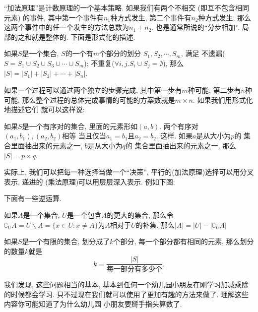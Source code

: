  ``加法原理''是计数原理的一个基本策略. 
如果我们有两个不相交 (即互不包含相同元素) 的事件, 其中第一个事件有$n_1$种方式发生, 
第二个事件有$n_2$种方式发生, 那么这两个事件中的任一个发生的方法总数为$n_1 + n_2$. 
也是通常所说的``分步相加''. 局部的之和就是整体的. 下面是形式化的描述. 

\begin{principle}[加法原理]
如果$S$是一个集合, $S$的一个有$m$个部分的划分
$S_1, S_2,\cdots, S_m$, 满足
不遗漏($S=S_1 \cup S_2 \cup S_3 \cup \cdots \cup S_m$); 不重复($\forall 
i,j. S_i \cup S_j = \emptyset$), 那么$|S|=|S_1|+|S_2|+\cdots+|S_n|$. 
\end{principle}

如果一个过程可以通过两个独立的步骤完成, 其中第一步有$m$种可能, 第二步有$n$种可能, 
那么整个过程的总体完成事情的可能的方案数就是$m\times n$. 如果我们用形式化地描述它们
就可以这样说: 

\begin{principle}[乘法原理]
  如果$S$是一个有序对的集合, 里面的元素形如$(a,b )$. 两个有序对$(a_1, b_1), (a_2, b_2)$相等
  当且仅当$a_1=b_1$且$a_2=b_2$. 这样. 如果$a$是从大小为$p$的
  集合里面抽出来的元素之一, $b$是从大小为$q$的
  集合里面抽出来的元素之一, 那么$|S|=p\times q$.
\end{principle}

实际上, 我们可以把每一种选择当做一个``决策'', 平行的(加法原理)选择可以用分叉表示, 递进的
(乘法原理)可以用层层深入表示. 例如下图:

下面有一些逆运算. 

\begin{principle}[减法原则]
  如果$A$是一个集合, $U$是一个包含$A$的更大的集合, 那么令$\complement_U A = U\backslash A
  =\{x\in U : x \neq A\}$为$A$相对于$U$的补集. 那么$|A| = |U|-|\complement_U A|$
\end{principle}

\begin{principle}[除法原则]
  如果$S$是一个有限的集合, 划分成了$k$个部分, 每一个部分都有相同的元素, 那么划分的数量$k$就是
  $$k=\frac{|S|}{\text{每一部分有多少个}}. $$
\end{principle}

我们发现, 这些问题相当的基本, 基本到任何一个幼儿园小朋友在刚学习加减乘除的时候都会学习. 
只不过现在我们就可以使用了更加有趣的方法来做了. 理解这些内容你可能知道了为什么幼儿园
小朋友要掰手指头算数了. 

